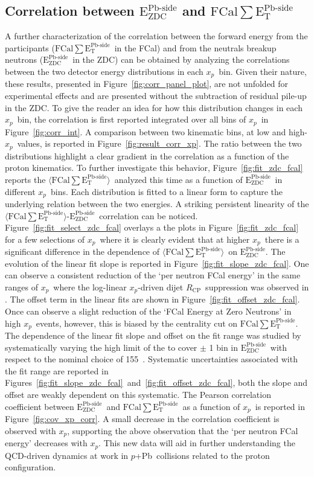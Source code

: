 \documentclass[NOTE, atlasdraft=true, texlive=2020, UKenglish]{atlasdoc}
\newcommand{\EZDC}{$\text{E}_\text{ZDC}^\text{Pb-side}$}
\newcommand{\EATPB}{$\langle \text{FCal} \sum \text{E}_{\text{T}}^{\text{Pb-side} } \rangle$}
\newcommand{\ETPB}{$\text{FCal} \sum \text{E}_{\text{T}}^{\text{Pb-side} }$}
\newcommand{\RCP}{$R_\text{CP}$}
\newcommand{\xp}{$x_{p}$}
\newcommand{\pxPb}{$p$+Pb}
\begin{document}
\subsection{Correlation between \texorpdfstring{\EZDC}{EZDC} and \texorpdfstring{\ETPB}{FCAlET}}
A further characterization of the correlation between the forward energy from the participants (\ETPB\ in the FCal) and from the neutrals breakup neutrons (\EZDC\ in the ZDC) can be obtained by analyzing the correlations between the two detector energy distributions in each \xp\ bin.  Given their nature, these results, presented in Figure~\ref{fig:corr_panel_plot}, are not unfolded for experimental effects and are presented without the subtraction of residual pile-up in the ZDC. To give the reader an idea for how this distribution changes in each \xp\ bin, the correlation is first reported integrated over all bins of \xp\ in Figure~\ref{fig:corr_int}.
A comparison between two kinematic bins, at low and high-\xp\ values, is reported in Figure~\ref{fig:result_corr_xp}. The ratio between the two distributions highlight a clear gradient in the correlation as a function of the proton kinematics. To further investigate this behavior, 
Figure~\ref{fig:fit_zdc_fcal} reports the \EATPB\ analyzed this time as a function of \EZDC\ in different \xp\ bins. Each distribution is fitted to a linear form to capture the underlying relation between the two energies. A striking persistent linearity of the \EATPB-\EZDC\ correlation can be noticed. Figure~\ref{fig:fit_select_zdc_fcal} overlays a the plots in Figure~\ref{fig:fit_zdc_fcal} for a few selections of \xp\, where it is clearly evident that at higher \xp\ there is a significant difference in the dependence of \EATPB\ on \EZDC.  The evolution of the linear fit slope is reported in Figure~\ref{fig:fit_slope_zdc_fcal}. One can observe a consistent reduction of the `per neutron FCal energy' in the same ranges of \xp\ where the log-linear \xp-driven dijet \RCP\ suppression was observed in \cite{ATLAS:2023zfx}. The offset term in the linear fits are shown in Figure~\ref{fig:fit_offset_zdc_fcal}.  Once can observe a slight reduction of the `FCal Energy at Zero Neutrons' in high \xp\ events, however, this is biased by the centrality cut on \ETPB.  The dependence of the linear fit slope and offset on the fit range was studied by systematically varying the high limit of the to cover $\pm$ 1 bin in \EZDC\ with respect to the nominal choice of 155~\TeV.  Systematic uncertainties associated with the fit range are reported in Figures~\ref{fig:fit_slope_zdc_fcal}~and~\ref{fig:fit_offset_zdc_fcal}, both the slope and offset are weakly dependent on this systematic. The Pearson correlation coefficient between \EZDC\ and \ETPB\ as a function of \xp\ is reported in Figure~\ref{fig:cov_xp_corr}.  A small decrease in the correlation coefficient is observed with \xp, supporting the above observation that the `per neutron FCal energy' decreases with \xp. This new data will aid in further understanding the QCD-driven dynamics at work in \pxPb\ collisions related to the proton configuration. 
\end{document}
